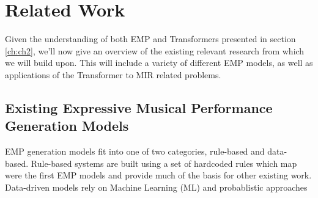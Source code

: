 \chapter{Related Work}\label{ch:ch3}
Given the understanding of both EMP and Transformers presented in section \ref{ch:ch2}, we'll now give an overview of the existing relevant research from which we will build upon. This will include a variety of different EMP models, as well as applications of the Transformer to MIR related problems. 
\section{Existing Expressive Musical Performance Generation Models}
EMP generation models fit into one of two categories, rule-based and data- based. Rule-based systems are built using a set of hardcoded rules which map were the first EMP models and provide much of the basis for other existing work. Data-driven models rely on Machine Learning (ML) and probablistic approaches 

